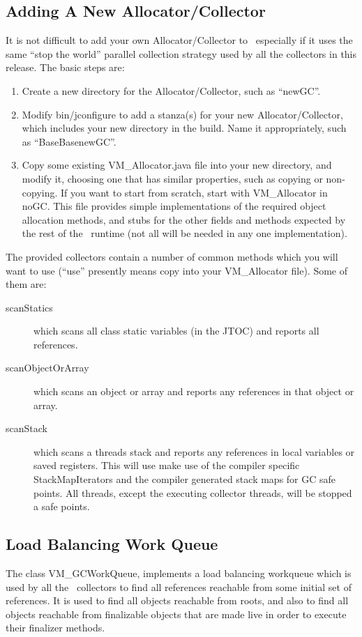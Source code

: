 \subsection{Adding A New Allocator/Collector} \label{sssec:newalloc}
It is not difficult to add your own Allocator/Collector to \jp\,
especially if it uses the same ``stop the world'' parallel collection
strategy used by all the collectors in this release.  The basic steps
are:
\begin{enumerate}
\item Create a new directory for the Allocator/Collector, such as ``newGC''.
\item Modify bin/jconfigure to add a stanza(s) for your new Allocator/Collector,
which includes your new directory in the build.  Name it appropriately, such as
``BaseBasenewGC''.
\item Copy some existing VM\_Allocator.java file into your new directory,
and modify it, choosing one that has similar properties, such as copying or
non-copying.  If you want to start from scratch, start with VM\_Allocator in noGC.
This file provides simple implementations of the required object allocation
methods, and stubs for the other fields and methods expected by the rest
of the \jp\ runtime (not all will be needed in any one implementation).
\end{enumerate}

The provided collectors contain a number of common methods which you
will want to use (``use'' presently means copy into your VM\_Allocator file).
Some of them are:
\begin{description}
\item[scanStatics] which scans all class static variables (in the JTOC) and
reports all references.
\item[scanObjectOrArray] which scans an object or array and reports any references
in that object or array.
\item[scanStack] which scans a threads stack and reports any references in
local variables or saved registers.  This will use make use of the compiler
specific StackMapIterators and the compiler generated stack maps for GC safe points.
All threads, except the executing collector threads, will be stopped a safe points.
\end{description}

\subsection{Load Balancing Work Queue} \label{sssec:workqueue}
The class VM\_GCWorkQueue, implements a load balancing workqueue
which is used by all the \jp\ collectors to find all references reachable from
some initial set of references.  It is used to find all objects reachable
from roots, and also to find all objects reachable from finalizable objects
that are made live in order to execute their finalizer methods.

